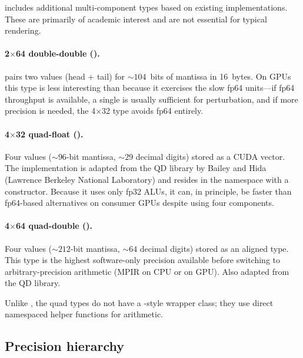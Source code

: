 \FractalShark{} includes additional multi-component types based on existing
implementations.  These are primarily of academic interest and are not
essential for typical rendering.

\paragraph{2\texorpdfstring{$\times$}{x}64 double-double ().}
 pairs two  values (head + tail) for
${\sim}104$~bits of mantissa in 16~bytes.  On GPUs this type is less interesting
than  because it exercises the slow fp64 units---if fp64
throughput is available, a single  is usually sufficient for
perturbation, and if more precision is needed, the 4$\times$32 type avoids
fp64 entirely.

\paragraph{4\texorpdfstring{$\times$}{x}32 quad-float ().}
Four  values (${\sim}96$-bit mantissa, ${\sim}29$ decimal digits)
stored as a CUDA  vector.  The implementation is adapted from the
QD library by Bailey and Hida \cite{Hida2001QD} (Lawrence Berkeley National Laboratory) and
resides in the  namespace with a  constructor.
Because it uses only fp32 ALUs, it can, in principle, be faster than fp64-based alternatives
on consumer GPUs despite using four components.

\paragraph{4\texorpdfstring{$\times$}{x}64 quad-double ().}
Four  values (${\sim}212$-bit mantissa, ${\sim}64$ decimal
digits) stored as an aligned  type.  This type is the highest
software-only precision available before switching to arbitrary-precision
arithmetic (MPIR \cite{MPIR_Library} on CPU or  on GPU).  Also adapted from
the QD library.

Unlike , the quad types do not have a -style
wrapper class; they use direct namespaced helper functions for arithmetic.

\subsection{Precision hierarchy}
\label{subsec:ep-hierarchy}

